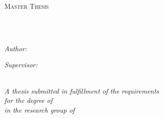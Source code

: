 \documentclass[
10pt, %
twoside, %
chapterinoneline,%
onehalfspacing, %
nolistspacing, %
parskip, %
headsepline, %
english,
]{MastersDoctoralThesis} %
\author{Philipp Hacker} %
\date{\today} %
\begin{document}
\frontmatter %

\pagestyle{plain} %


\begin{titlepage}
	
	\begin{center}
		
		{\scshape\LARGE \univname\par}\vspace{1.5cm} %
		\textsc{\Large Master Thesis}\\[0.5cm] %
		
		\HRule\\[0.4cm]%
		{\huge \bfseries \ttitle\par}\vspace{0.4cm} %
		\HRule\\[1.5cm]%
		
		\begin{minipage}[htbp]{0.4\textwidth}
			
			\begin{flushleft} \large
				\emph{Author:}\4\
				\authorname%
			\end{flushleft}
			
		\end{minipage}
		\hfill
		\begin{minipage}[htbp]{0.4\textwidth}
			
			\begin{flushright}\large
				
				\emph{Supervisor:} \\
				\supname%

			\end{flushright}
			
		\end{minipage}\\[1.5cm]
		
		\large \textit{A thesis submitted in fulfillment of the requirements\\ for the degree of \degreename}\\[0.3cm] %
		\textit{in the research group of}\\[0.4cm]
		\groupname\\\deptname\\[1cm] %
		

\end{center}
\end{titlepage}
\end{document}
